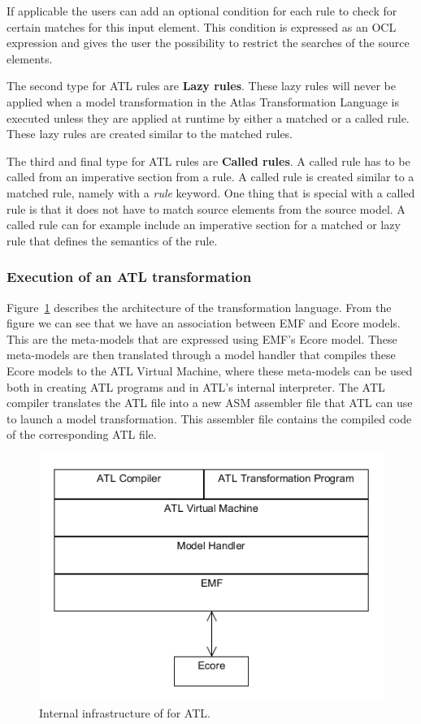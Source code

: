 If applicable the users can add an optional condition for each rule to check for
certain matches for this input element. This condition is expressed as an OCL
expression and gives the user the possibility to restrict the searches of the
source elements. 

The second type for ATL rules are \textbf{Lazy rules}. These lazy rules will
never be applied when a model transformation in the Atlas Transformation
Language is executed unless they are applied at runtime by either a matched or
a called rule. These lazy rules are created similar to the matched rules.

The third and final type for ATL rules are \textbf{Called rules}. A
called rule has to be called from an imperative section from a rule.
A called rule is created similar to a matched rule, namely with a \textit{rule}
keyword. One thing that is special with a called rule is that it does not have
to match source elements from the source model. A called rule can for example
include an imperative section for a matched or lazy rule that defines the
semantics of the rule.

\subsubsection*{Execution of an ATL transformation}

Figure~\ref{fig:ATL_Execution} describes the architecture of the transformation
language. From the figure we can see that we have an association between EMF and
Ecore models. This are the meta-models that are expressed using EMF's Ecore
model. These meta-models are then translated through a model handler that
compiles these Ecore models to the ATL Virtual Machine, where these meta-models
can be used both in creating ATL programs and in ATL's internal interpreter. The
ATL compiler translates the ATL file into a new ASM assembler file that ATL can
use to launch a model transformation. This assembler file contains the
compiled code of the corresponding ATL file.

\begin{figure}[H]
	\centering
	\includegraphics[scale=0.6]{figures/ATL_Execution.png}
	\caption[Internal infrastructure for ATL]
	{Internal infrastructure of for ATL.}
	\label{fig:ATL_Execution}
\end{figure}

